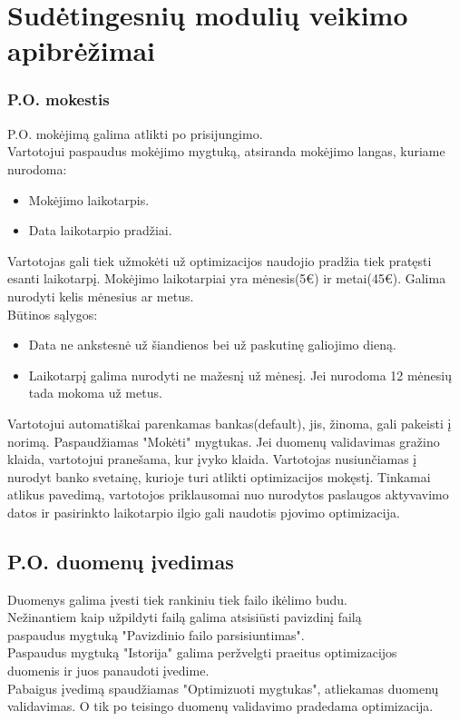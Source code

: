 \documentclass[a4paper,12pt]{article}
\begin{document}
\section{Sudėtingesnių modulių veikimo apibrėžimai}

\subsubsection{P.O. mokestis}
P.O. mokėjimą galima atlikti po prisijungimo. \\
Vartotojui paspaudus mokėjimo mygtuką, atsiranda mokėjimo langas, kuriame nurodoma:
\begin{itemize}
	\item Mokėjimo laikotarpis.
	\item Data laikotarpio pradžiai. 
\end{itemize} 

Vartotojas gali tiek užmokėti už optimizacijos naudojio pradžia tiek pratęsti esanti laikotarpį.
Mokėjimo laikotarpiai yra mėnesis(5€) ir metai(45€). Galima nurodyti kelis mėnesius ar metus. \\
Būtinos sąlygos:
\begin{itemize}
	\item Data ne ankstesnė už šiandienos bei už paskutinę galiojimo dieną.
	\item Laikotarpį galima nurodyti ne mažesnį už mėnesį. Jei nurodoma 12 mėnesių tada mokoma už metus.
\end{itemize}

Vartotojui automatiškai parenkamas bankas(default), jis, žinoma, gali pakeisti į norimą.
Paspaudžiamas "Mokėti" mygtukas.
Jei duomenų validavimas gražino klaida, vartotojui pranešama, kur įvyko klaida.
Vartotojas nusiunčiamas į nurodyt banko svetainę, kurioje turi atlikti optimizacijos mokęstį.
Tinkamai atlikus pavedimą, vartotojos priklausomai nuo nurodytos paslaugos aktyvavimo datos ir pasirinkto laikotarpio ilgio gali naudotis pjovimo optimizacija.
	
\subsection{ P.O. duomenų įvedimas }

Duomenys galima įvesti tiek rankiniu tiek failo ikėlimo budu.\\
Nežinantiem kaip užpildyti failą galima atsisiūsti pavizdinį failą\\
paspaudus mygtuką "Pavizdinio failo parsisiuntimas".\\
Paspaudus mygtuką "Istorija" galima peržvelgti praeitus optimizacijos \\
duomenis ir juos panaudoti įvedime.\\
Pabaigus įvedimą spaudžiamas "Optimizuoti mygtukas", atliekamas duomenų\\ validavimas. O tik po teisingo duomenų validavimo pradedama optimizacija.
\end{document}
